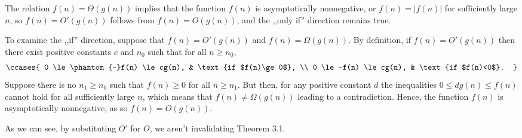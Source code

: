 The relation $f(n)=\Theta(g(n))$ implies that the function $f(n)$ is asymptotically nonnegative, or $f(n)=|f(n)|$ for sufficiently large $n$, so $f(n)=O'(g(n))$ follows from $f(n)=O(g(n))$, and the ,,only if'' direction remains true.

To examine the ,,if'' direction, suppose that $f(n)=O'(g(n))$ and $f(n)=\Omega(g(n))$.
By definition, if $f(n)=O'(g(n))$ then there exist positive constants $c$ and $n_0$ such that for all $n\ge n_0$,
\[
    \ccases{
        0 \le \phantom{-}f(n) \le cg(n), & \text{if $f(n)\ge0$}, \\
        0 \le -f(n) \le cg(n), & \text{if $f(n)<0$}.
    }
\]
Suppose there is no $n_1\ge n_0$ such that $f(n)\ge0$ for all $n\ge n_1$.
But then, for any positive constant $d$ the inequalities $0\le dg(n)\le f(n)$ cannot hold for all sufficiently large $n$, which means that $f(n)\ne\Omega(g(n))$ leading to a contradiction.
Hence, the function $f(n)$ is asymptotically nonnegative, as so $f(n)=O(g(n))$.

As we can see, by substituting $O'$ for $O$, we aren't invalidating Theorem 3.1.
